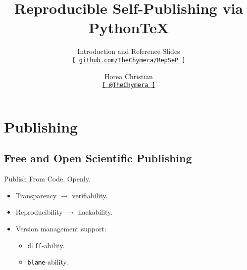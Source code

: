 

\title[Reproducible Self-Publishing via Python\TeX\ --- Introduction and Reference Slides]{Reproducible Self-Publishing via Python\TeX}
\subtitle{Introduction and Reference Slides\\\href{https://github.com/TheChymera/RepSeP}{\small\texttt{[ github.com/TheChymera/RepSeP ]}}}
\author[Horea Christian]{Horea Christian\\\href{https://twitter.com/TheChymera}{\small\texttt{[ @TheChymera ]}}}

	\begin{frame}
		\titlepage
	\end{frame}
	\section{Publishing}
		\subsection{Free and Open Scientific Publishing}
			\begin{frame}{Publish From Code, Openly.}
				\begin{itemize}
					\item Transparency $\longrightarrow$ verifiability.
					\item Reproducibility $\longrightarrow$ hackability.
					\item Version management support:
					\begin{itemize}
						\item \colorbox{tlg}{\texttt{diff}}-ability.
						\item \colorbox{tlg}{\texttt{blame}}-ability.
					\end{itemize}
				\end{itemize}
			\end{frame}


